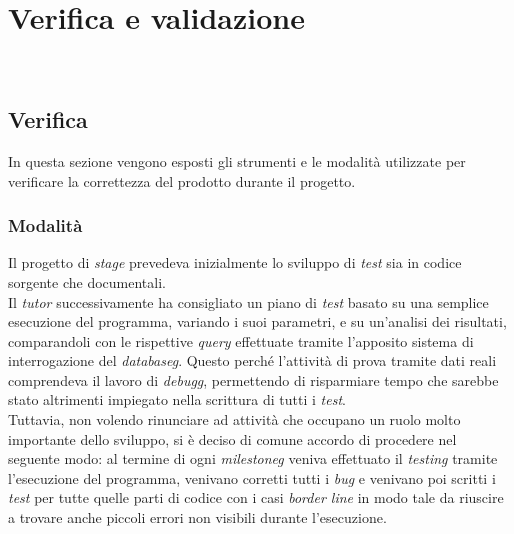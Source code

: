
\chapter{Verifica e validazione}
\label{cap:verifica-validazione}

\noindent {}\\

\section{Verifica}
\noindent In questa sezione vengono esposti gli strumenti e le modalità utilizzate
per verificare la correttezza del prodotto durante il progetto.

\subsection{Modalità}
\noindent Il progetto di \textit{stage} prevedeva inizialmente lo sviluppo di \textit{test} sia in codice
sorgente che documentali.\\

\noindent Il \textit{tutor} successivamente ha consigliato un piano di \textit{test} basato su una semplice
esecuzione del programma, variando i suoi parametri, e su un'analisi
dei risultati, comparandoli con le rispettive \textit{query} effettuate tramite
l'apposito sistema di interrogazione del \textit{\gls{databaseg}}.
Questo perché l’attività di prova tramite dati reali comprendeva il lavoro
di \textit{\gls{debugg}}, permettendo di risparmiare tempo che sarebbe stato altrimenti
impiegato nella scrittura di tutti i \textit{test}.\\

\noindent Tuttavia, non volendo rinunciare ad attività che occupano un ruolo molto importante dello
sviluppo, si è deciso di comune accordo di procedere nel seguente modo:
al termine di ogni \textit{\gls{milestoneg}} veniva effettuato il \textit{testing} tramite l'esecuzione del
programma, venivano corretti tutti i \textit{bug} e venivano poi scritti i \textit{test} per tutte
quelle parti di codice con i casi \textit{border line} in modo tale da riuscire a trovare anche
piccoli errori non visibili durante l'esecuzione.\\

